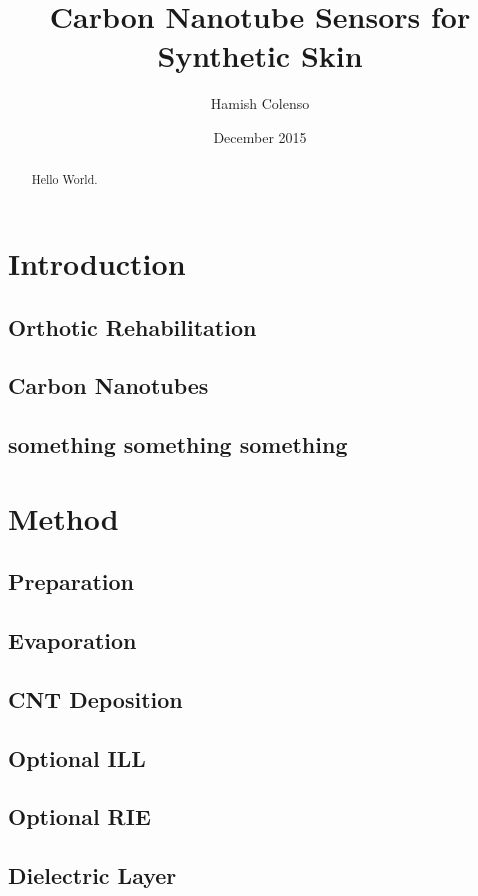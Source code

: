 \documentclass[11pt,twoside,a4paper]{article}
\begin{document}
	\title{Carbon Nanotube Sensors for Synthetic Skin}
	\author{Hamish Colenso}
	\date{December 2015}
	\maketitle
	
	\begin{abstract}
		Hello World.
	
	\end{abstract}
	
	\newpage
	\section{Introduction}
		\subsection{Orthotic Rehabilitation}
		\subsection{Carbon Nanotubes}
		\subsection{something something something}
	\newpage
	\section{Method}
		\subsection{Preparation}
		\subsection{Evaporation}
		\subsection{CNT Deposition}
		\subsection{Optional ILL}
		\subsection{Optional RIE}
		\subsection{Dielectric Layer}
\end{document}
